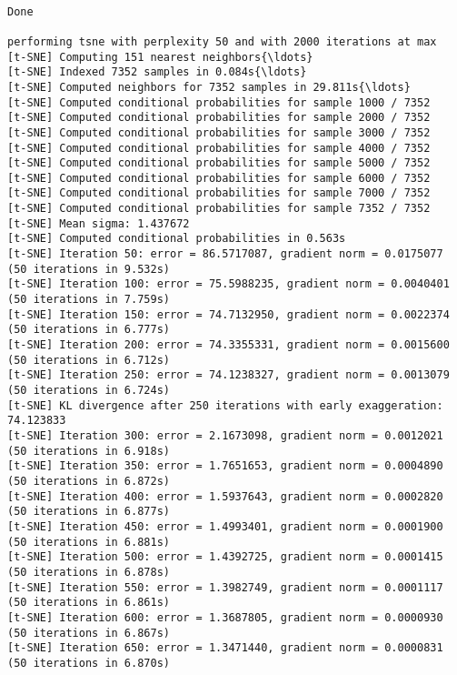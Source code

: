 \documentclass[11pt]{article}
\begin{document}
    \begin{center}
    \end{center}
    { \hspace*{\fill} \\}
    
    \begin{Verbatim}[commandchars=\\\{\}]
Done

performing tsne with perplexity 50 and with 2000 iterations at max
[t-SNE] Computing 151 nearest neighbors{\ldots}
[t-SNE] Indexed 7352 samples in 0.084s{\ldots}
[t-SNE] Computed neighbors for 7352 samples in 29.811s{\ldots}
[t-SNE] Computed conditional probabilities for sample 1000 / 7352
[t-SNE] Computed conditional probabilities for sample 2000 / 7352
[t-SNE] Computed conditional probabilities for sample 3000 / 7352
[t-SNE] Computed conditional probabilities for sample 4000 / 7352
[t-SNE] Computed conditional probabilities for sample 5000 / 7352
[t-SNE] Computed conditional probabilities for sample 6000 / 7352
[t-SNE] Computed conditional probabilities for sample 7000 / 7352
[t-SNE] Computed conditional probabilities for sample 7352 / 7352
[t-SNE] Mean sigma: 1.437672
[t-SNE] Computed conditional probabilities in 0.563s
[t-SNE] Iteration 50: error = 86.5717087, gradient norm = 0.0175077 (50 iterations in 9.532s)
[t-SNE] Iteration 100: error = 75.5988235, gradient norm = 0.0040401 (50 iterations in 7.759s)
[t-SNE] Iteration 150: error = 74.7132950, gradient norm = 0.0022374 (50 iterations in 6.777s)
[t-SNE] Iteration 200: error = 74.3355331, gradient norm = 0.0015600 (50 iterations in 6.712s)
[t-SNE] Iteration 250: error = 74.1238327, gradient norm = 0.0013079 (50 iterations in 6.724s)
[t-SNE] KL divergence after 250 iterations with early exaggeration: 74.123833
[t-SNE] Iteration 300: error = 2.1673098, gradient norm = 0.0012021 (50 iterations in 6.918s)
[t-SNE] Iteration 350: error = 1.7651653, gradient norm = 0.0004890 (50 iterations in 6.872s)
[t-SNE] Iteration 400: error = 1.5937643, gradient norm = 0.0002820 (50 iterations in 6.877s)
[t-SNE] Iteration 450: error = 1.4993401, gradient norm = 0.0001900 (50 iterations in 6.881s)
[t-SNE] Iteration 500: error = 1.4392725, gradient norm = 0.0001415 (50 iterations in 6.878s)
[t-SNE] Iteration 550: error = 1.3982749, gradient norm = 0.0001117 (50 iterations in 6.861s)
[t-SNE] Iteration 600: error = 1.3687805, gradient norm = 0.0000930 (50 iterations in 6.867s)
[t-SNE] Iteration 650: error = 1.3471440, gradient norm = 0.0000831 (50 iterations in 6.870s)

\end{Verbatim}
\end{document}
